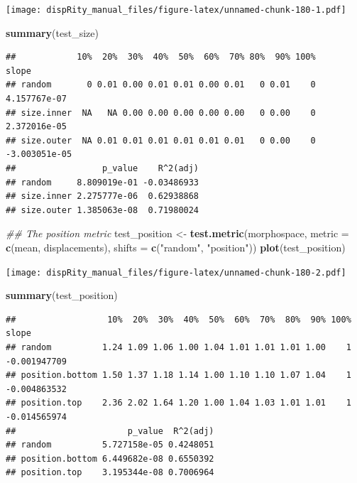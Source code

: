 \documentclass[]{book}
\newenvironment{Shaded}{\begin{snugshade}}{\end{snugshade}}
\newcommand{\CommentTok}[1]{\textcolor[rgb]{0.56,0.35,0.01}{\textit{#1}}}
\newcommand{\DataTypeTok}[1]{\textcolor[rgb]{0.13,0.29,0.53}{#1}}
\newcommand{\KeywordTok}[1]{\textcolor[rgb]{0.13,0.29,0.53}{\textbf{#1}}}
\newcommand{\NormalTok}[1]{#1}
\newcommand{\StringTok}[1]{\textcolor[rgb]{0.31,0.60,0.02}{#1}}
\begin{document}
\texttt{[image: dispRity\_manual\_files/figure-latex/unnamed-chunk-180-1.pdf]}

\begin{Shaded}
\begin{Highlighting}[]
\KeywordTok{summary}\NormalTok{(test_size)}
\end{Highlighting}
\end{Shaded}

\begin{verbatim}
##            10%  20%  30%  40%  50%  60%  70% 80%  90% 100%         slope
## random       0 0.01 0.00 0.01 0.01 0.00 0.01   0 0.01    0  4.157767e-07
## size.inner  NA   NA 0.00 0.00 0.00 0.00 0.00   0 0.00    0  2.372016e-05
## size.outer  NA 0.01 0.01 0.01 0.01 0.01 0.01   0 0.00    0 -3.003051e-05
##                 p_value    R^2(adj)
## random     8.809019e-01 -0.03486933
## size.inner 2.275777e-06  0.62938868
## size.outer 1.385063e-08  0.71980024
\end{verbatim}

\begin{Shaded}
\begin{Highlighting}[]
\CommentTok{## The position metric}
\NormalTok{test_position <-}\StringTok{ }\KeywordTok{test.metric}\NormalTok{(morphospace, }\DataTypeTok{metric =} \KeywordTok{c}\NormalTok{(mean, displacements),}
                         \DataTypeTok{shifts =} \KeywordTok{c}\NormalTok{(}\StringTok{"random"}\NormalTok{, }\StringTok{"position"}\NormalTok{))}
\KeywordTok{plot}\NormalTok{(test_position)}
\end{Highlighting}
\end{Shaded}

\texttt{[image: dispRity\_manual\_files/figure-latex/unnamed-chunk-180-2.pdf]}

\begin{Shaded}
\begin{Highlighting}[]
\KeywordTok{summary}\NormalTok{(test_position)}
\end{Highlighting}
\end{Shaded}

\begin{verbatim}
##                  10%  20%  30%  40%  50%  60%  70%  80%  90% 100%        slope
## random          1.24 1.09 1.06 1.00 1.04 1.01 1.01 1.01 1.00    1 -0.001947709
## position.bottom 1.50 1.37 1.18 1.14 1.00 1.10 1.10 1.07 1.04    1 -0.004863532
## position.top    2.36 2.02 1.64 1.20 1.00 1.04 1.03 1.01 1.01    1 -0.014565974
##                      p_value  R^2(adj)
## random          5.727158e-05 0.4248051
## position.bottom 6.449682e-08 0.6550392
## position.top    3.195344e-08 0.7006964
\end{verbatim}
\end{document}
